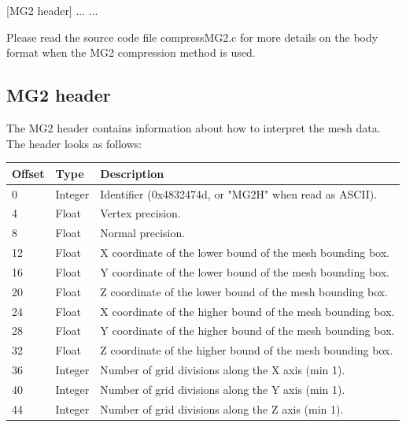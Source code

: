 [MG2 header]\newline
[Vertices]\newline
[Indices]\newline
[Normals]\newline
[UV map 0]\newline
[UV map 1]\newline
...\newline
[UV map N]\newline
...

Please read the source code file compressMG2.c for more details on the body
format when the MG2 compression method is used.

\subsection{MG2 header}
The MG2 header contains information about how to interpret the mesh data. The
header looks as follows:

\begin{tabular}{|l|l|l|}\hline
\textbf{Offset} &  \textbf{Type} & \textbf{Description}\\ \hline
0 & Integer & Identifier (0x4832474d, or "MG2H" when read as ASCII).\\ \hline
4 & Float & Vertex precision.\\ \hline
8 & Float & Normal precision.\\ \hline
12 & Float & X coordinate of the lower bound of the mesh bounding box.\\ \hline
16 & Float & Y coordinate of the lower bound of the mesh bounding box.\\ \hline
20 & Float & Z coordinate of the lower bound of the mesh bounding box.\\ \hline
24 & Float & X coordinate of the higher bound of the mesh bounding box.\\ \hline
28 & Float & Y coordinate of the higher bound of the mesh bounding box.\\ \hline
32 & Float & Z coordinate of the higher bound of the mesh bounding box.\\ \hline
36 & Integer & Number of grid divisions along the X axis (min 1).\\ \hline
40 & Integer & Number of grid divisions along the Y axis (min 1).\\ \hline
44 & Integer & Number of grid divisions along the Z axis (min 1).\\ \hline
\end{tabular}


